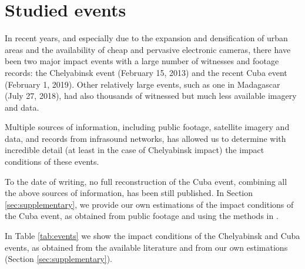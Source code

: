 \documentclass[fleqn,usenatbib]{mnras}
\begin{document}

\section{Studied events}
\label{sec:events}


In recent years, and especially due to the expansion and densification of urban areas and the availability of cheap and pervasive electronic cameras, there have been two major impact events with a large number of witnesses and footage records: the Chelyabinsk event (February 15, 2013) and the recent Cuba event (February 1, 2019). Other relatively large events, such as one in Madagascar (July 27, 2018), had also thousands of witnessed but much less available imagery and data.

Multiple sources of information, including public footage, satellite imagery and data, and records from infrasound networks, has allowed us to determine with incredible detail (at least in the case of Chelyabinsk impact) the impact conditions of these events. 

To the date of writing, no full reconstruction of the Cuba event, combining all the above sources of information, has been still published.  In Section \ref{sec:supplementary}, we provide our own estimations of the impact conditions of the Cuba event, as obtained from public footage and using the methods in \citealt{Zuluaga2013}.

In Table \ref{tab:events} we show the impact conditions of the Chelyabinsk and Cuba events, as obtained from the available literature \citep{Zuluaga2013,Popova2013,Borovivcka2013} and from our own estimations (Section \ref{sec:supplementary}). 
\end{document}
